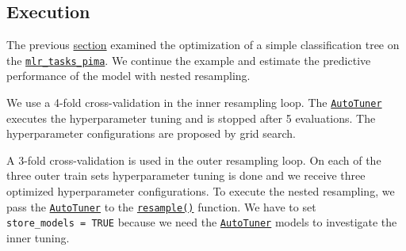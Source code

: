 \documentclass[
]{scrbook}
\newenvironment{Shaded}{\begin{snugshade}}{\end{snugshade}}
\newcommand{\AttributeTok}[1]{\textcolor[rgb]{0.77,0.63,0.00}{#1}}
\newcommand{\DecValTok}[1]{\textcolor[rgb]{0.00,0.00,0.81}{#1}}
\newcommand{\FloatTok}[1]{\textcolor[rgb]{0.00,0.00,0.81}{#1}}
\newcommand{\FunctionTok}[1]{\textcolor[rgb]{0.00,0.00,0.00}{#1}}
\newcommand{\NormalTok}[1]{#1}
\newcommand{\OtherTok}[1]{\textcolor[rgb]{0.56,0.35,0.01}{#1}}
\newcommand{\SpecialCharTok}[1]{\textcolor[rgb]{0.00,0.00,0.00}{#1}}
\newcommand{\StringTok}[1]{\textcolor[rgb]{0.31,0.60,0.02}{#1}}
\renewenvironment{Shaded} {\begin{snugshade}\small} {\end{snugshade}}
\begin{document}
\hypertarget{nested-resamp-exec}{%
\subsection{Execution}\label{nested-resamp-exec}}

The previous \protect\hyperlink{tuning}{section} examined the optimization of a simple classification tree on the \href{https://mlr3.mlr-org.com/reference/mlr_tasks_pima.html}{\texttt{mlr\_tasks\_pima}}.
We continue the example and estimate the predictive performance of the model with nested resampling.

We use a 4-fold cross-validation in the inner resampling loop.
The \href{https://mlr3tuning.mlr-org.com/reference/AutoTuner.html}{\texttt{AutoTuner}} executes the hyperparameter tuning and is stopped after 5 evaluations.
The hyperparameter configurations are proposed by grid search.

\begin{Shaded}
\end{Shaded}

A 3-fold cross-validation is used in the outer resampling loop.
On each of the three outer train sets hyperparameter tuning is done and we receive three optimized hyperparameter configurations.
To execute the nested resampling, we pass the \href{https://mlr3tuning.mlr-org.com/reference/AutoTuner.html}{\texttt{AutoTuner}} to the \href{https://mlr3.mlr-org.com/reference/resample.html}{\texttt{resample()}} function.
We have to set \texttt{store\_models\ =\ TRUE} because we need the \href{https://mlr3tuning.mlr-org.com/reference/AutoTuner.html}{\texttt{AutoTuner}} models to investigate the inner tuning.
\end{document}
